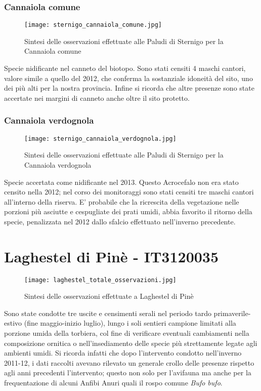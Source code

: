 \documentclass[11pt,a4paper,twoside]{memoir}
\begin{document}
\subsubsection{Cannaiola comune}
\vspace*{\fill}
\begin{figure}[H]
  \centering
  \texttt{[image: sternigo\_cannaiola\_comune.jpg]}
  \caption{Sintesi delle osservazioni effettuate alle Paludi di Sternigo per la Cannaiola comune}
\end{figure}\vspace*{\fill}
Specie nidificante nel canneto del biotopo. Sono stati censiti 4 maschi cantori, valore simile a quello del 2012, che conferma la sostanziale idoneità del sito, uno dei più alti per la nostra provincia. Infine si ricorda che altre presenze sono state accertate nei margini di canneto anche oltre il sito protetto. 

\subsubsection{Cannaiola verdognola}
\vspace*{\fill}
\begin{figure}[H]
  \centering
  \texttt{[image: sternigo\_cannaiola\_verdognola.jpg]}
  \caption{Sintesi delle osservazioni effettuate alle Paludi di Sternigo per la Cannaiola verdognola}
\end{figure}\vspace*{\fill}
Specie accertata come nidificante nel 2013. Questo Acrocefalo non era stato censito nella 2012; nel corso dei monitoraggi sono stati censiti tre maschi cantori all'interno della riserva. E’ probabile che la ricrescita della vegetazione nelle porzioni più asciutte e cespugliate dei prati umidi, abbia favorito il ritorno della specie, penalizzata nel 2012 dallo sfalcio effettuato nell’inverno precedente. 

\newpage
\section{Laghestel di Pinè - IT3120035}
\vspace*{\fill}
\begin{figure}[H]
  \centering
  \texttt{[image: laghestel\_totale\_osservazioni.jpg]}
  \caption{Sintesi delle osservazioni effettuate a Laghestel di Pinè}
\end{figure}\vspace*{\fill}
Sono state condotte tre uscite e censimenti serali nel periodo tardo primaverile-estivo (fine maggio-inizio luglio), lungo i soli sentieri campione limitati alla porzione umida della torbiera, col fine di verificare eventuali cambiamenti nella composizione ornitica o nell’insediamento delle specie più strettamente legate agli ambienti umidi. Si ricorda infatti che dopo l’intervento condotto nell’inverno 2011-12, i dati raccolti avevano rilevato un generale crollo delle presenze rispetto agli anni precedenti l’intervento; questo non solo per l’avifauna ma anche per la frequentazione di alcuni Anfibi Anuri quali il rospo comune \emph{Bufo bufo}.
\end{document}
